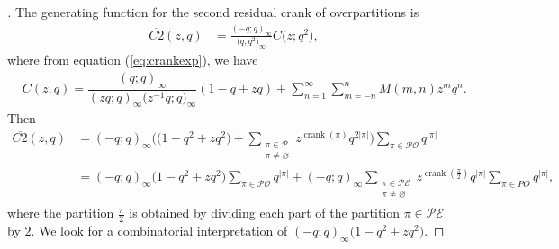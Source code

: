 \documentclass[10pt,a4paper]{amsart}
\numberwithin{equation}{section}
\newcommand\eqn[1]{(\ref{eq:#1})}
\begin{document}
\begin{proof}[\unskip\nopunct]
The generating function for the second residual crank of overpartitions is
\begin{align*}
\overline{C2}(z,q)&=\frac{(-q;q)_{\infty}}{\bigl(q;q^2\bigr)_{\infty}}C\bigl(z;q^2\bigr),
\end{align*}
where from equation \eqn{crankexp}, we have
\begin{align*}
&{}C(z,q)=\dfrac{(q;q)_{\infty}}{(zq;q)_{\infty}\bigl(z^{-1}q;q\bigr)_{\infty}}
(1-q+zq)+\sum_{n=1}^\infty \sum_{m=-n}^n  M(m,n) z^m q^n.
\end{align*}
Then
\begin{align*}
\overline{C2}(z,q)&=(-q;q)_{\infty} \biggl(\bigl(1-q^2+zq^2\bigr)+\sum\limits_{\substack{{\pi \in \mathcal{P}}\\ \pi \neq \varnothing}}z^{\operatorname{crank}(\pi)}q^{2 |\pi|}\biggr) \sum_{\pi \in \mathcal{PO}}q^{|\pi|}
\\
&=(-q;q)_{\infty} \bigl(1-q^2+zq^2\bigr)\sum_{\pi \in \mathcal{PO}}q^{|\pi|}+(-q;q)_{\infty} \sum\limits_{\substack{{\pi \in \mathcal{PE}}\\ \pi \neq \varnothing}}z^{\operatorname{crank}(\frac{\pi}{2})}q^{|\pi|} \sum_{\pi \in PO}q^{|\pi|},
\end{align*}
where the partition $\frac{\pi}{2}$ is obtained by dividing each part of the partition $\pi \in \mathcal{PE}$ by $2$. We look for a combinatorial interpretation of $(-q;q)_{\infty}\bigl(1-q^2+zq^2\bigr)$.


\end{proof}
\end{document}
